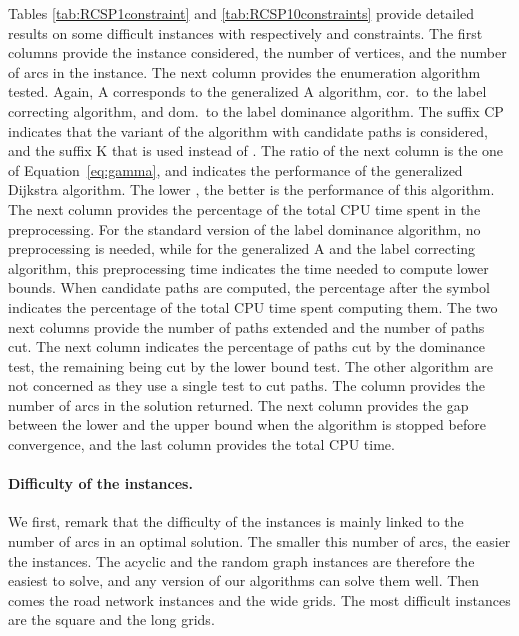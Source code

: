 \documentclass[11pt]{amsart}
\theoremstyle{plain}
\theoremstyle{remark}
\begin{document}
Tables \ref{tab:RCSP1constraint} and \ref{tab:RCSP10constraints} provide detailed results on some difficult instances with respectively  and  constraints. The first columns provide the instance considered, the number of vertices, and the number of arcs in the instance. The next column provides the enumeration algorithm tested. Again, A corresponds to the generalized A algorithm, cor.~to the label correcting algorithm, and dom.~to the label dominance algorithm. The suffix CP indicates that the variant of the algorithm with candidate paths is considered, and the suffix K that  is used instead of . The ratio  of the next column is the one of Equation~\eqref{eq:gamma}, and indicates the performance of the generalized Dijkstra algorithm. The lower , the better is the performance of this algorithm.  The next column provides the percentage of the total CPU time spent in the preprocessing. For the standard version of the label dominance algorithm, no preprocessing is needed, while for the generalized A and the label correcting algorithm, this preprocessing time indicates the time needed to compute lower bounds. When candidate paths are computed, the percentage after the symbol  indicates the percentage of the total CPU time spent computing them. The two next columns provide the number of paths extended and the number of paths cut. The next column indicates the percentage of paths cut by the dominance test, the remaining being cut by the lower bound test. The other algorithm are not concerned as they use a single test to cut paths. The column  provides the number of arcs in the solution returned. The next column provides the gap between the lower and the upper bound when the algorithm is stopped before convergence, and the last column provides the total CPU time.

\paragraph{Difficulty of the instances.} We first, remark that the difficulty of the instances is mainly linked to the number of arcs  in an optimal solution. The smaller this number of arcs, the easier the instances. The acyclic and the random graph instances are therefore the easiest to solve, and any version of our algorithms can solve them well. Then comes the road network instances and the wide grids. The most difficult instances are the square and the long grids. 
\end{document}
